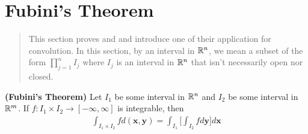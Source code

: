 \documentclass{report}
\begin{document}
\section{Fubini's Theorem}
\begin{abstract}
  This section proves  and  and introduce one of their application for convolution. In this section, by an interval in $\mathbb{R}^n$, we mean a subset of the form  $\prod_{j=1}^n I_j$ where $I_j$ is an interval in  $\mathbb{R}^n$ that isn't necessarily open nor closed. 
\end{abstract}
\begin{theorem}
\label{FT}
\textbf{(Fubini's Theorem)} Let $I_1$ be some interval in  $\mathbb{R}^n$ and  $I_2$ be some interval in $\mathbb{R}^m$. If  $f:I_1 \times I_2\rightarrow [-\infty,\infty]$ is integrable, then 
\begin{align*}
\int_{I_1\times I_2}fd(\textbf{x},\textbf{y})=\int_{I_1} \Big[\int_{I_2}fd\textbf{y} \Big]d\textbf{x}
\end{align*}
\end{theorem}
\end{document}
